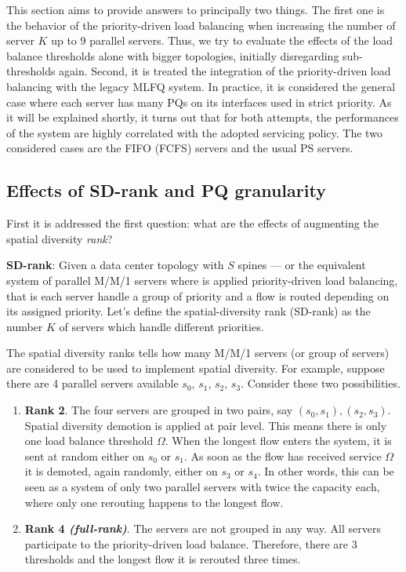 This section aims to provide answers to principally two things. The first one is the behavior of the priority-driven load balancing when increasing the number of server $K$ up to 9 parallel servers. Thus, we try to evaluate the effects of the load balance thresholds alone with bigger topologies, initially disregarding sub-thresholds again. Second, it is treated the integration of the priority-driven load balancing with the legacy MLFQ system. In practice, it is considered the general case where each server has many PQs on its interfaces used in strict priority. As it will be explained shortly, it turns out that for both attempts, the performances of the system are highly correlated with the adopted servicing policy. The two considered cases are the FIFO (FCFS) servers and the usual PS servers. 

\subsection{Effects of SD-rank and PQ granularity}
\label{sec:dimensioning-spatial}
First it is addressed the first question: what are the effects of augmenting the spatial diversity \emph{rank}? 
\begin{tcolorbox}[title=Terminology]
	\textbf{SD-rank}: Given a data center topology with $S$ spines --- or the equivalent system of parallel M/M/1 servers where is applied priority-driven load balancing, that is each server handle a group of priority and a flow is routed depending on its assigned priority. Let's define the spatial-diversity rank (SD-rank) as the number $K$ of servers which handle different priorities. 
\end{tcolorbox}
The spatial diversity ranks tells how many M/M/1 servers (or group of servers) are considered to be used to implement spatial diversity. For example, suppose there are 4 parallel servers available $s_0$, $s_1$, $s_2$, $s_3$. Consider these two possibilities. 
\begin{enumerate}
	\item \textbf{Rank 2}. The four servers are grouped in two pairs, say $(s_0, s_1), (s_2,s_3)$. Spatial diversity demotion is applied at pair level. This means there is only one load balance threshold $\Omega$. When the longest flow enters the system, it is sent at random either on $s_0$ or $s_1$. As soon as the flow has received service $\Omega$ it is demoted, again randomly, either on $s_3$ or $s_4$. In other words, this can be seen as a system of only two parallel servers with twice the capacity each, where only one rerouting happens to the longest flow. 
	\item \textbf{Rank 4 \textit{(full-rank)}}. The servers are not grouped in any way. All servers participate to the priority-driven load balance. Therefore, there are 3 thresholds and the longest flow it is rerouted three times.
\end{enumerate}
